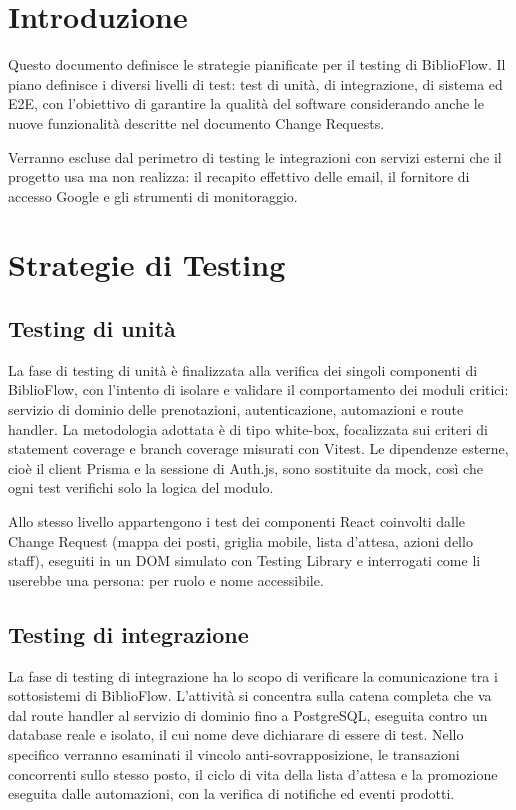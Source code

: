 \documentclass[11pt,a4paper,oneside,openany]{book}
\begin{document}
\frontmatter
\copertina
\tableofcontents

\mainmatter
\chapter{Introduzione}

Questo documento definisce le strategie pianificate per il testing di
BiblioFlow. Il piano definisce i diversi livelli di test: test di unità, di
integrazione, di sistema ed E2E, con l'obiettivo di garantire la qualità del
software considerando anche le nuove funzionalità descritte nel documento
Change Requests.

Verranno escluse dal perimetro di testing le integrazioni con servizi esterni
che il progetto usa ma non realizza: il recapito effettivo delle email, il
fornitore di accesso Google e gli strumenti di monitoraggio.

\chapter{Strategie di Testing}

\section{Testing di unità}

La fase di testing di unità è finalizzata alla verifica dei singoli componenti
di BiblioFlow, con l'intento di isolare e validare il comportamento dei moduli
critici: servizio di dominio delle prenotazioni, autenticazione, automazioni e
route handler. La metodologia adottata è di tipo white-box, focalizzata sui
criteri di statement coverage e branch coverage misurati con Vitest. Le
dipendenze esterne, cioè il client Prisma e la sessione di Auth.js, sono
sostituite da mock, così che ogni test verifichi solo la logica del modulo.

Allo stesso livello appartengono i test dei componenti React coinvolti dalle
Change Request (mappa dei posti, griglia mobile, lista d'attesa, azioni dello
staff), eseguiti in un DOM simulato con Testing Library e interrogati come li
userebbe una persona: per ruolo e nome accessibile.

\section{Testing di integrazione}

La fase di testing di integrazione ha lo scopo di verificare la comunicazione
tra i sottosistemi di BiblioFlow. L'attività si concentra sulla catena
completa che va dal route handler al servizio di dominio fino a PostgreSQL,
eseguita contro un database reale e isolato, il cui nome deve dichiarare di
essere di test. Nello specifico verranno esaminati il vincolo
anti-sovrapposizione, le transazioni concorrenti sullo stesso posto, il ciclo
di vita della lista d'attesa e la promozione eseguita dalle automazioni, con
la verifica di notifiche ed eventi prodotti.
\end{document}
